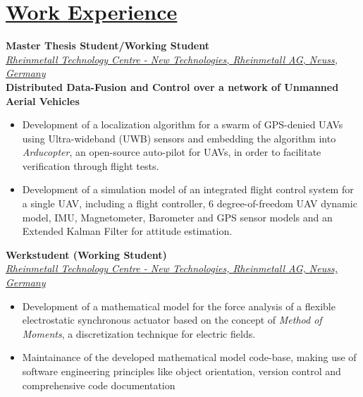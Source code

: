 
\section{\underline{Work Experience}}

\large{\textbf{Master Thesis Student/Working Student}}
\hfill
\masterarbeitdate\\
\href{https://www.rheinmetall.com/de/karriere/rheinmetall-als-arbeitgeber/menschen-projekte/karriere-extra-technology-center}{\large{\emph{Rheinmetall Technology Centre - New Technologies, Rheinmetall AG, Neuss, Germany}}}\\
\large{\textbf{Distributed Data-Fusion and Control over a network of Unmanned Aerial Vehicles}}
\begin{itemize}
	\item Development of a localization algorithm for a swarm of GPS-denied UAVs using Ultra-wideband (UWB) sensors and embedding the algorithm into \emph{Arducopter}, an open-source auto-pilot for UAVs, in order to facilitate verification through flight tests.
    \item Development of a simulation model of an integrated flight control system for a single UAV, including a flight controller, 6 degree-of-freedom UAV dynamic model, IMU, Magnetometer, Barometer and GPS sensor models and an Extended Kalman Filter for attitude estimation.
\end{itemize}

\vspace{0.1 in}

\large{\textbf{Werkstudent (Working Student)}}
\hfill
\rheinmetalldate\\
\href{https://www.rheinmetall.com/de/karriere/rheinmetall-als-arbeitgeber/menschen-projekte/karriere-extra-technology-center}{\large{\emph{Rheinmetall Technology Centre - New Technologies, Rheinmetall AG, Neuss, Germany}}}
\begin{itemize}
\item\large{Development of a mathematical model for the force analysis of a flexible electrostatic synchronous actuator based on the concept of \emph{Method of Moments}, a discretization technique for electric fields.}
\item\large{Maintainance of the developed mathematical model code-base, making use of software engineering principles like object orientation, version control and comprehensive code documentation}
\end{itemize}

